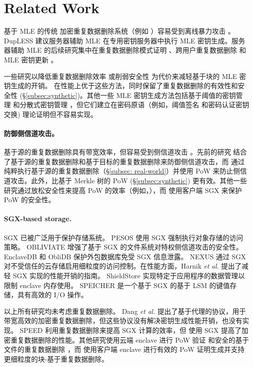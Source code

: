 \section{Related Work}
\label{sec:related_work}

 基于 MLE 的传统 \cite{bellare13a} 加密重复数据删除系统（例如 \cite{adya02,cox02,shah15}）容易受到离线暴力攻击 \cite{bellare13b}。 DupLESS \cite{bellare13b} 建议服务器辅助 MLE 在专用密钥服务器中执行 MLE 密钥生成。服务器辅助 MLE 的后续研究集中在重复数据删除模式证明 \cite{armknecht15}、跨用户重复数据删除 \cite{zhou15} 和 MLE 密钥更新 \cite{qin17}。

一些研究以降低重复数据删除效率 \cite{zhou15,qin17} 或削弱安全性 \cite{li20a} 为代价来减轻基于块的 MLE 密钥生成的开销。 \sysname 在性能上优于这些方法，同时保留了重复数据删除的有效性和安全性 (\S\ref{subsec:synthetic})。其他一些 MLE 密钥生成方法包括基于阈值的密钥管理 \cite{duan14} 和分散式密钥管理 \cite{liu15}，但它们建立在密码原语（例如，阈值签名 \cite{duan14} 和密码认证密钥交换\cite{liu15}) 理论证明但不容易实现。

\paragraph{防御侧信道攻击。} 基于源的重复数据删除具有带宽效率，但容易受到侧信道攻击 \cite{harnik10}。先前的研究 \cite{harnik10, li15} 结合了基于源的重复数据删除和基于目标的重复数据删除来防御侧信道攻击，而 \sysname 通过纯粹执行基于源的重复数据删除（\S\ref{subsec: real-world}）并使用 PoW 来防止侧信道攻击。此外，\sysname 比基于 Merkle 树的 PoW (\S\ref{subsec:synthetic}) 更有效。其他一些研究通过放松安全性来提高 PoW 的效率（例如，\cite{pietro12,xu13}），而 \sysname 使用客户端 SGX 来保护 PoW 的安全性。

\paragraph{SGX-based storage.} SGX \cite{sgx} 已被广泛用于保护存储系统。 PESOS \cite{krahn18} 使用 SGX 强制执行对象存储的访问策略。 OBLIVIATE \cite{ahmad18} 增强了基于 SGX 的文件系统对特权侧信道攻击的安全性。 EnclaveDB \cite{priebe18} 和 ObliDB \cite{eskandarian19} 保护外包数据库免受 SGX 信息泄露。 NEXUS \cite{djoko19} 通过 SGX 对不受信任的云存储启用细粒度的访问控制。在性能方面，Harnik {\em et al.} \cite{harnik18} 提出了减轻 SGX 实现的性能开销的指南。 ShieldStore \cite{kim19} 实现特定于应用程序的数据管理以限制 enclave 内存使用。 SPEICHER \cite{bailleu19} 是一个基于 SGX 的基于 LSM 的键值存储，具有高效的 I/O 操作。

以上所有研究均未考虑重复数据删除。 Dang {\em et al.} \cite{dang17} 提出了基于代理的协议，用于带宽高效的加密重复数据删除，但这些协议没有解决密钥生成性能开销，也没有实现。 SPEED \cite{cui19} 利用重复数据删除来提高 SGX 计算的效率，但 \sysname 使用 SGX 提高了加密重复数据删除的性能。其他研究使用云端 enclave 进行 PoW 验证 \cite{you20} 和安全的基于文件的重复数据删除 \cite{fuhry20}，而 \sysname 使用客户端 enclave 进行有效的 PoW 证明生成并支持更细粒度的块-基于重复数据删除。
